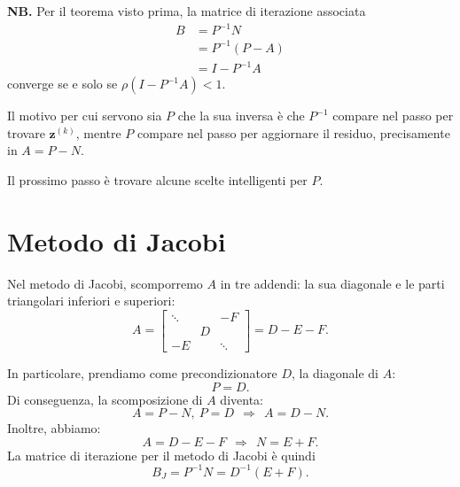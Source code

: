 \textbf{NB.}
Per il teorema visto prima, la matrice di iterazione associata
\begin{align*}
B & =P^{-1} N\\
 & =P^{-1}( P-A)\\
 & =I-P^{-1} A
\end{align*}
converge se e solo se $\rho \left( I-P^{-1} A\right) < 1$.

Il motivo per cui servono sia $P$ che la sua inversa è che $P^{-1}$ compare nel passo per trovare $\mathbf{z}^{(k)}$, mentre $P$ compare nel passo per aggiornare il residuo, precisamente in $A=P-N$.

Il prossimo passo è trovare alcune scelte intelligenti per $P$.

\section{Metodo di Jacobi}
Nel metodo di Jacobi, scomporremo $A$ in tre addendi: la sua diagonale e le parti triangolari inferiori e superiori:
\begin{equation*}
A=\begin{bmatrix}
\ddots  &  & -F\\
 & D & \\
-E &  & \ddots
\end{bmatrix} =D-E-F.
\end{equation*}

In particolare, prendiamo come precondizionatore $D$, la diagonale di $A$:
\begin{equation*}
P=D.
\end{equation*}
Di conseguenza, la scomposizione di $A$ diventa:
\begin{equation*}
A=P-N,\ P=D\ \ \Rightarrow \ \ A=D-N.
\end{equation*}
Inoltre, abbiamo:
\begin{equation*}
A=D-E-F\ \ \Rightarrow \ \ N=E+F.
\end{equation*}
La matrice di iterazione per il metodo di Jacobi è quindi
\begin{equation*}
B_{J} =P^{-1} N=D^{-1}( E+F) .
\end{equation*}


